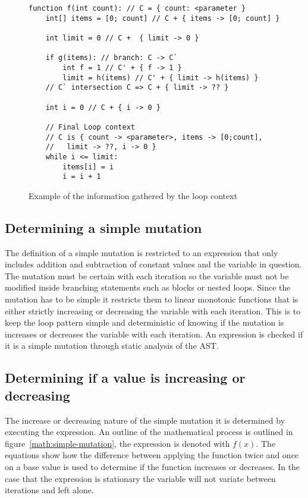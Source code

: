 \begin{figure}[ht]
\begin{lstlisting}
function f(int count): // C = { count: <parameter }
    int[] items = [0; count] // C + { items -> [0; count] }

    int limit = 0 // C +  { limit -> 0 } 

    if g(items): // branch: C -> C`
        int f = 1 // C' + { f -> 1 }
        limit = h(items) // C' + { limit -> h(items) }
    // C` intersection C => C + { limit -> ?? }

    int i = 0 // C + { i -> 0 }

    // Final Loop context
    // C is { count -> <parameter>, items -> [0;count],
    //   limit -> ??, i -> 0 }
    while i <= limit:
        items[i] = i
        i = i + 1
\end{lstlisting}
\caption{Example of the information gathered by the loop context}
\label{lst:loop-context}
\end{figure}

\subsection{Determining a simple mutation}\label{s:simple-mut}


The definition of a simple mutation is restricted to an expression that only
includes addition and subtraction of constant values and the variable in question.
The mutation must be certain with each iteration so the variable must not be
modified inside branching statements such as  blocks or nested loops.
Since the mutation has to be simple it restricts them to linear monotonic
functions that is either strictly increasing or decreasing the variable with each iteration.
This is to keep the loop pattern simple and deterministic of knowing if the
mutation is increases or decreases the variable with each iteration.
An expression is checked if it is a simple mutation through static analysis of
the AST.

\subsection{Determining if a value is increasing or decreasing}\label{s:sequence-dir}

The increase or decreasing nature of the simple mutation it is determined by
executing the expression. An outline of the mathematical process is outlined
in figure~\ref{math:simple-mutation}, the expression is denoted with $f(x)$.
The equations show how the difference between applying the function
twice and once on a base value is used to determine if the function
increases or decreases.
In the case that the expression is stationary the variable will not variate
between iterations and left alone.

